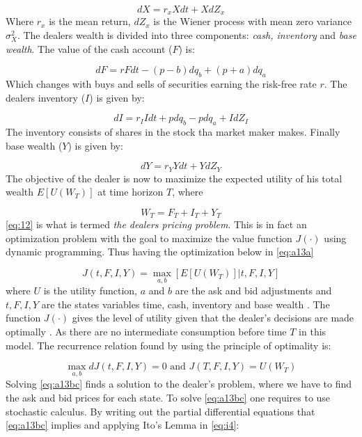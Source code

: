 \documentclass{kththesis}
\theoremstyle{definition}
\begin{document}
\begin{equation}
    \label{eq:a8}
    dX = r_{x}Xdt + XdZ_x
\end{equation}
Where $r_x$ is the mean return, $dZ_x$ is the Wiener process with mean zero variance $\sigma^{2}_X$. The dealers wealth is divided into three components: \textit{cash, inventory} and \textit{base wealth}. The value of the cash account ($F$) is:

\begin{equation}
    \label{eq:a9}
    dF = rFdt- (p-b)dq_b + (p+a)dq_a
\end{equation}
Which changes with buys and sells of securities earning the risk-free rate $r$. The dealers inventory ($I$) is given by:

\begin{equation}
    \label{eq:a10}
    dI = r_{I}Idt+pdq_{b} - pdq_{a} + IdZ_{I}
\end{equation}
The inventory consists of shares in the stock tha market maker makes.
Finally base wealth ($Y$) is given by:

\begin{equation}
    \label{eq:a11}
    dY = r_{Y}Ydt+YdZ_{Y} 
\end{equation}
The objective of the dealer is now to maximize the expected utility of his total wealth $E[U(W_T)]$ at time horizon $T$, where 

\begin{equation}
    \label{eq:a12}
    W_{T} = F_{T} + I_{T} + Y_{T}
\end{equation}
\autoref{eq:12} is what is termed \textit{the dealers pricing problem}. This is in fact an optimization problem with the goal to maximize the value function $J(\cdot)$ using dynamic programming. Thus having the optimization below in \autoref{eq:a13a}

\begin{equation}
    \label{eq:a13a}
    J(t,F,I,Y) = \underset{a,b}{\max}[E[U(W_T)] | t,F,I,Y]
\end{equation}
where $U$ is the utility function, $a$ and $b$ are the ask and bid adjustments and $t, F, I,Y$ are the states variables time, cash, inventory and base wealth \parencite{o1995market}. The function $J(\cdot)$ gives the level of utility given that the dealer's decisions are made optimally \parencite{o1995market}. As there are no intermediate consumption before time $T$ in this model. The recurrence relation found by using the principle of optimality is:

\begin{equation}
    \label{eq:a13bc}
    \underset{a,b}{\max}dJ(t,F,I,Y)=0 \text{ and } 
    J(T,F,I,Y)=U(W_T)
\end{equation}
Solving \autoref{eq:a13bc} finds a solution to the dealer's problem, where we have to find the ask and bid prices for each state. To solve \autoref{eq:a13bc} one requires to use stochastic calculus. By writing out the partial differential equations that \autoref{eq:a13bc} implies and applying Ito's Lemma in \autoref{eq:i4}:
\end{document}
